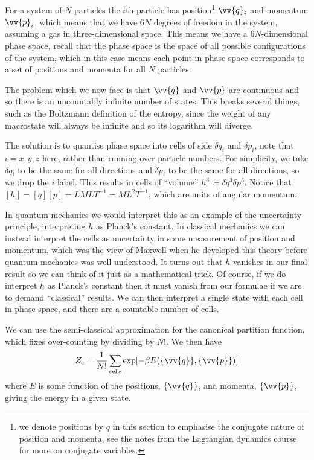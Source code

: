 \documentclass[fleqn]{NotesClass}
\newcommand*{\cpartition}{Z_{\mathrm{c}}}
\begin{document}
    For a system of \(N\) particles the \(i\)th particle has position\footnote{we denote positions by \(q\) in this section to emphasise the conjugate nature of position and momenta, see the notes from the Lagrangian dynamics course for more on conjugate variables.} \(\vv{q}_i\) and momentum \(\vv{p}_i\), which means that we have \(6N\) degrees of freedom in the system, assuming a gas in three-dimensional space.
    This means we have a \(6N\)-dimensional phase space, recall that the phase space is the space of all possible configurations of the system, which in this case means each point in phase space corresponds to a set of positions and momenta for all \(N\) particles.
    
    The problem which we now face is that \(\vv{q}\) and \(\vv{p}\) are continuous and so there is an uncountably infinite number of states.
    This breaks several things, such as the Boltzmann definition of the entropy, since the weight of any macrostate will always be infinite and so its logarithm will diverge.
    
    The solution is to quantise phase space into cells of side \(\delta q_i\) and \(\delta p_i\), note that \(i = x, y, z\) here, rather than running over particle numbers.
    For simplicity, we take \(\delta q_i\) to be the same for all directions and \(\delta p_i\) to be the same for all directions, so we drop the \(i\) label.
    This results in cells of \enquote{volume} \(h^3 \coloneqq \delta q^3 \delta p^3\).
    Notice that \([h] = [q][p] = LMLT^{-1} = ML^2T^{-1}\), which are units of angular momentum.
    
    In quantum mechanics we would interpret this as an example of the uncertainty principle, interpreting \(h\) as Planck's constant.
    In classical mechanics we can instead interpret the cells as uncertainty in some measurement of position and momentum, which was the view of Maxwell when he developed this theory before quantum mechanics was well understood.
    It turns out that \(h\) vanishes in our final result so we can think of it just as a mathematical trick.
    Of course, if we do interpret \(h\) as Planck's constant then it must vanish from our formulae if we are to demand \enquote{classical} results.
    We can then interpret a single state with each cell in phase space, and there are a countable number of cells.
    
    We can use the semi-classical approximation for the canonical partition function, which fixes over-counting by dividing by \(N!\).
    We then have
    \begin{equation}
        \cpartition = \frac{1}{N!} \sum_{\mathclap{\mathrm{cells}}} \exp[-\beta E(\{\vv{q}\}, \{\vv{p}\})]
    \end{equation}
    where \(E\) is some function of the positions, \(\{\vv{q}\}\), and momenta, \(\{\vv{p}\}\), giving the energy in a given state.
    
\end{document}
